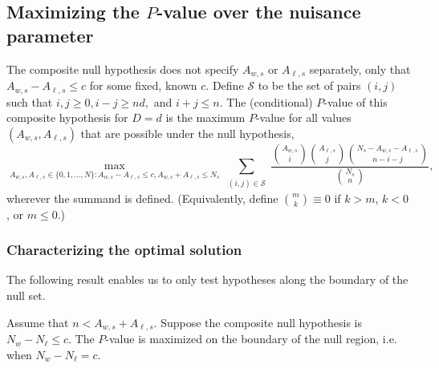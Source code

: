 \subsection{Maximizing the $P$-value over the nuisance parameter}

The composite null hypothesis does not specify $A_{w,s}$ or $A_{\ell,s}$ separately, only 
that $A_{w,s} - A_{\ell,s} \le c$ for
some fixed, known $c$.
Define $\mathcal{S}$ to be the set of pairs $(i, j)$ such that $i, j\ge 0, i-j \ge nd,$ and $ i+j \leq n$.
The (conditional) $P$-value of this composite hypothesis for $D=d$ is the maximum $P$-value for all
values $(A_{w,s}, A_{\ell,s})$ that are possible under the null hypothesis,
\begin{equation}
  \max_{A_{w,s}, A_{\ell,s} \in \{0, 1, \ldots, N \}: A_{w,s} - A_{\ell,s} \le c, A_{w,s} + A_{\ell,s} \le N_s}
   \sum_{\substack{(i, j)\in \mathcal{S}}} \frac{ {A_{w,s } \choose i}{A_{\ell,s} \choose j}{N_s - A_{w,s} - A_{\ell,s} \choose n-i-j}}{{N_s \choose n}},
\end{equation}
wherever the summand is defined. 
(Equivalently, define ${m \choose k} \equiv 0$ if $k > m$, $k < 0$, or $m \le 0$.)

\subsubsection{Characterizing the optimal solution}
The following result enables us to only test hypotheses along the boundary of the null set.

\begin{thm}
Assume that $n < A_{w,s}+A_{\ell,s}$.
Suppose the composite null hypothesis is $N_w - N_\ell \leq c$.
The $P$-value is maximized on the boundary of the null region, i.e. when $N_w - N_\ell = c$.
\end{thm}

